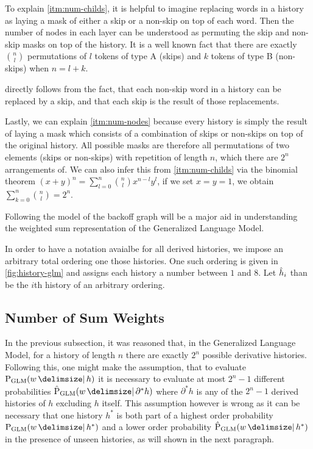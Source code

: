 To explain \cref{itm:num-childs}, it is helpful to imagine replacing words in
a history as laying a mask of either a skip or a non-skip on top of each word.
Then the number of nodes in each layer can be understood as permuting the
skip and non-skip masks on top of the history.
It is a well known fact that there are exactly $\binom{n}{l}$ permutations of
$l$ tokens of type A (skips) and $k$ tokens of type B (non-skips) when
$n = l + k$.

 directly follows from the fact, that each non-skip word
in a history can be replaced by a skip, and that each skip is the result
of those replacements.

Lastly, we can explain \cref{itm:num-nodes} because every history is simply the
result of laying a mask which consists of a combination of skips or non-skips on
top of the original history.
All possible masks are therefore all permutations of two elements (skips or
non-skips) with repetition of length $n$, which there are $2^n$ arrangements of.
We can also infer this from \cref{itm:num-childs} via the binomial theorem
$(x+ y)^n = \sum_{l=0}^n \binom{n}{l} x^{n-l} y^l$, if we set ${x = y = 1}$,
we obtain $\sum_{k=0}^n \binom{n}{l} = 2^n$.

Following the model of the backoff graph will be a major aid in understanding
the weighted sum representation of the Generalized Language Model.

In order to have a notation avaialbe for all derived histories, we impose an
arbitrary total ordering one those histories.
One such ordering is given in \cref{fig:history-glm} and assigns each history
a number between $1$ and $8$.
Let $\DerivedHistory[i]$ than be the $i$th history of an arbitrary ordering.

\subsection{Number of Sum Weights}

In the previous subsection, it was reasoned that, in the Generalized Language
Model, for a history of length $n$ there are exactly $2^n$ possible derivative
histories.
Following this, one might make the assumption, that to evaluate $\ProbGLM{w}{h}$
it is necessary to evaluate at most $2^n - 1$  different probabilities
$\ProbGLM*{w}{\partial^* h}$ where $\partial^* h$ is any of the $2^n - 1$
derived histories of $h$ excluding $h$ itself.
This assumption however is wrong as it can be necessary that one history $h^*$
is both part of a highest order probability $\ProbGLM{w}{h^*}$ and a lower order
probability $\ProbGLM*{w}{h^*}$ in the presence of unseen histories, as will
shown in the next paragraph.

